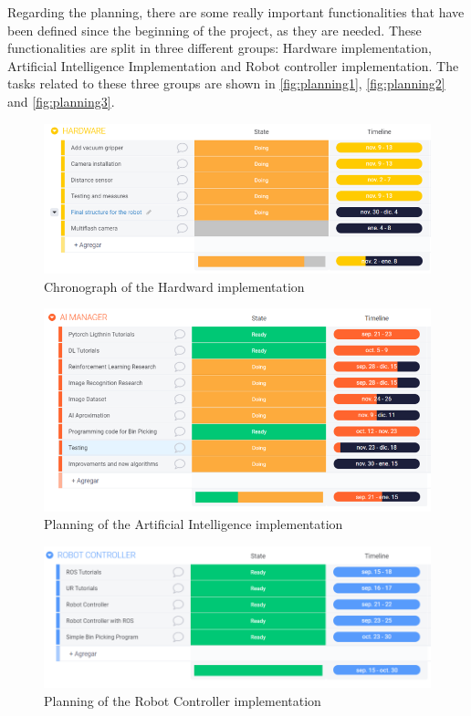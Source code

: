 			Regarding the planning, there are some really important functionalities that have been defined since the beginning of the project, as they are needed. These functionalities are split in three different groups: Hardware implementation, Artificial Intelligence Implementation and Robot controller implementation. The tasks related to these three groups are shown in \autoref{fig:planning1}, \autoref{fig:planning2} and \autoref{fig:planning3}. 
		
		\begin{figure}
			\centering
			\includegraphics[width=0.85\linewidth]{Images/planning1}
			\caption[Chronograph HW]{Chronograph of the Hardward implementation}
			\label{fig:planning1}
		\end{figure}
		
		
		\begin{figure}
			\centering
			\includegraphics[width=0.85\linewidth]{Images/planning2}
			\caption[Planning AI]{Planning of the Artificial Intelligence implementation}
			\label{fig:planning2}
		\end{figure}
		
		
		\begin{figure}
			\centering
			\includegraphics[width=0.85\linewidth]{Images/planning3}
			\caption[Planing Robot Controller]{Planning of the Robot Controller implementation}
			\label{fig:planning3}
		\end{figure}
		
